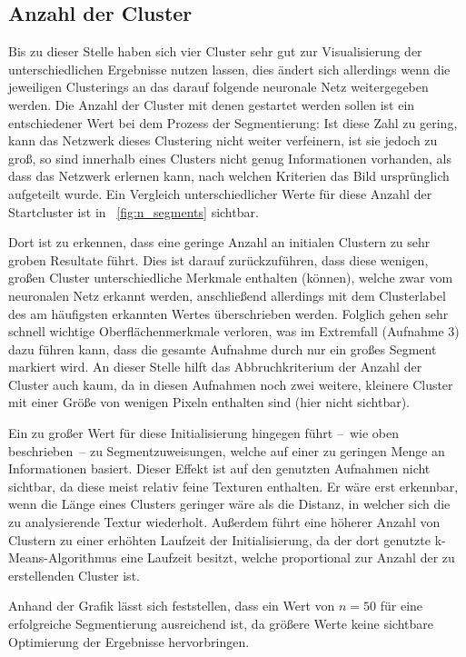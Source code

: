\subsection{Anzahl der Cluster}
\label{ssec:initialization_number_of_segments}

Bis zu dieser Stelle haben sich vier Cluster sehr gut zur Visualisierung der unterschiedlichen Ergebnisse nutzen lassen, dies ändert sich allerdings wenn die jeweiligen Clusterings an das darauf folgende neuronale Netz weitergegeben werden. Die Anzahl der Cluster mit denen gestartet werden sollen ist ein entschiedener Wert bei dem Prozess der Segmentierung: Ist diese Zahl zu gering, kann das Netzwerk dieses Clustering nicht weiter verfeinern, ist sie jedoch zu groß, so sind innerhalb eines Clusters nicht genug Informationen vorhanden, als dass das Netzwerk erlernen kann, nach welchen Kriterien das Bild ursprünglich aufgeteilt wurde. Ein Vergleich unterschiedlicher Werte für diese Anzahl der Startcluster ist in \figurename~\ref{fig:n_segments} sichtbar.

Dort ist zu erkennen, dass eine geringe Anzahl an initialen Clustern zu sehr groben Resultate führt. Dies ist darauf zurückzuführen, dass diese wenigen, großen Cluster unterschiedliche Merkmale enthalten (können), welche zwar vom neuronalen Netz erkannt werden, anschließend allerdings mit dem Clusterlabel des am häufigsten erkannten Wertes überschrieben werden. Folglich gehen sehr schnell wichtige Oberflächenmerkmale verloren, was im Extremfall (\vgl Aufnahme 3) dazu führen kann, dass die gesamte Aufnahme durch nur ein großes Segment markiert wird. An dieser Stelle hilft das Abbruchkriterium der Anzahl der Cluster auch kaum, da in diesen Aufnahmen noch zwei weitere, kleinere Cluster mit einer Größe von wenigen Pixeln enthalten sind (hier nicht sichtbar).

Ein zu großer Wert für diese Initialisierung hingegen führt --~wie oben beschrieben~-- zu Segmentzuweisungen, welche auf einer zu geringen Menge an Informationen basiert. Dieser Effekt ist auf den genutzten Aufnahmen nicht sichtbar, da diese meist relativ feine Texturen enthalten. Er wäre erst erkennbar, wenn die Länge eines Clusters geringer wäre als die Distanz, in welcher sich die zu analysierende Textur wiederholt. Außerdem führt eine höherer Anzahl von Clustern zu einer erhöhten Laufzeit der Initialisierung, da der dort genutzte k-Means-Algorithmus eine Laufzeit besitzt, welche proportional zur Anzahl der zu erstellenden Cluster ist.

Anhand der Grafik lässt sich feststellen, dass ein Wert von $n=50$ für eine erfolgreiche Segmentierung ausreichend ist, da größere Werte keine sichtbare Optimierung der Ergebnisse hervorbringen.

